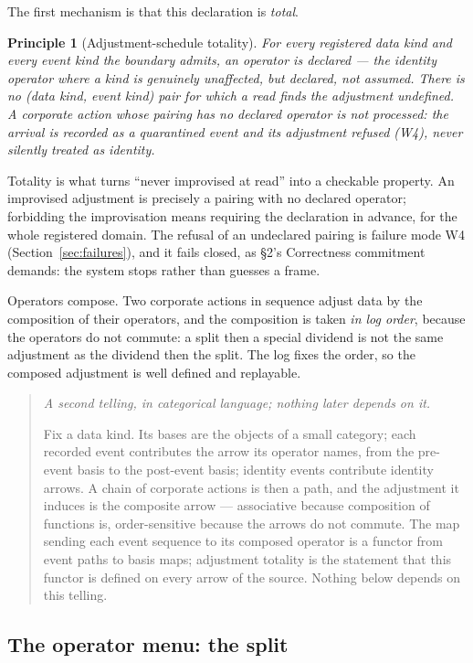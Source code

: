 \documentclass[11pt,a4paper]{article}
\newtheorem{principle}[definition]{Principle}
\newenvironment{secondtelling}%
  {\par\medskip\noindent\begin{quote}\small\emph{A second telling, in categorical language; nothing later depends on it.}\par\smallskip}%
  {\end{quote}\medskip}
\begin{document}
The first mechanism is that this declaration is \emph{total}.

\begin{principle}[Adjustment-schedule totality]\label{prin:sched-total}
For every registered data kind and every event kind the boundary admits, an operator is
declared --- the identity operator where a kind is genuinely unaffected, but declared, not
assumed. There is no (data kind, event kind) pair for which a read finds the adjustment
undefined. A corporate action whose pairing has no declared operator is not processed: the
arrival is recorded as a quarantined event and its adjustment refused (W4), never silently
treated as identity.
\end{principle}

Totality is what turns ``never improvised at read'' into a checkable property. An
improvised adjustment is precisely a pairing with no declared operator; forbidding the
improvisation means requiring the declaration in advance, for the whole registered domain.
The refusal of an undeclared pairing is failure mode W4 (Section~\ref{sec:failures}), and
it fails closed, as \S 2's Correctness commitment demands: the system stops rather than
guesses a frame.

Operators compose. Two corporate actions in sequence adjust data by the composition of
their operators, and the composition is taken \emph{in log order}, because the operators do
not commute: a split then a special dividend is not the same adjustment as the dividend
then the split. The log fixes the order, so the composed adjustment is well defined and
replayable.

\begin{secondtelling}
Fix a data kind. Its bases are the objects of a small category; each recorded event
contributes the arrow its operator names, from the pre-event basis to the post-event basis;
identity events contribute identity arrows. A chain of corporate actions is then a path, and
the adjustment it induces is the composite arrow --- associative because composition of
functions is, order-sensitive because the arrows do not commute. The map sending each event
sequence to its composed operator is a functor from event paths to basis maps; adjustment
totality is the statement that this functor is defined on every arrow of the source. Nothing
below depends on this telling.
\end{secondtelling}

\subsection{The operator menu: the split}\label{sec:menu}
\end{document}
